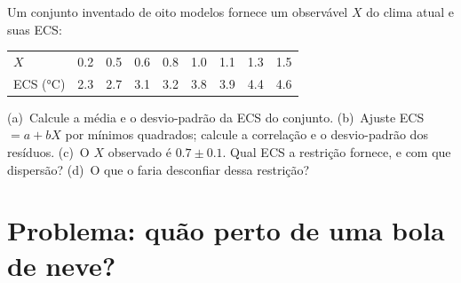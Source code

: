 \begin{exercise}[$\star\star\star$]\label{exo:b3:climate-models:12}
Um conjunto inventado de oito modelos fornece um observável $X$ do
clima atual e suas ECS:
\begin{center}
\begin{tabular}{l*{8}{c}}
\hline
$X$ & 0.2 & 0.5 & 0.6 & 0.8 & 1.0 & 1.1 & 1.3 & 1.5\\
ECS (\unit{\celsius}) & 2.3 & 2.7 & 3.1 & 3.2 & 3.8 & 3.9 & 4.4 & 4.6\\
\hline
\end{tabular}
\end{center}
(a)~Calcule a média e o desvio-padrão da ECS do
conjunto. (b)~Ajuste ECS $= a + bX$ por mínimos quadrados; calcule a correlação
e o desvio-padrão dos resíduos. (c)~O $X$ observado é $0.7
\pm 0.1$. Qual ECS a restrição fornece, e com que dispersão?
(d)~O que o faria desconfiar dessa restrição?
\end{exercise}

\section{Problema: quão perto de uma bola de neve?}

